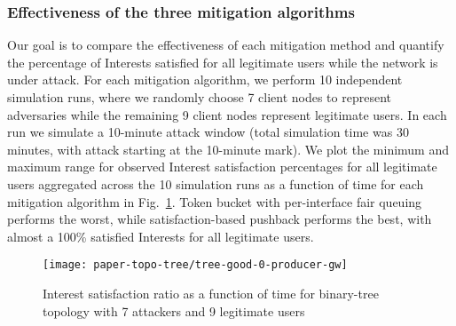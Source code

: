\subsubsection{Effectiveness of the three mitigation algorithms}


Our goal is to compare the effectiveness of each mitigation method and quantify the percentage of Interests satisfied for all legitimate users while the network is under attack. For each mitigation algorithm, we perform 10 independent simulation runs, where we randomly choose 7 client nodes to represent adversaries while the remaining 9 client nodes represent legitimate users. In each run we simulate a 10-minute attack window (total simulation time was 30 minutes, with attack starting at the 10-minute mark). We plot the minimum and maximum range for observed Interest satisfaction percentages for all legitimate users aggregated across the 10 simulation runs as a function of time for each mitigation algorithm in Fig.~\ref{fig:small-scale attack progress}. Token bucket with per-interface fair queuing performs the worst, while satisfaction-based pushback performs the best, with almost a 100\%  satisfied Interests for all legitimate users.


\begin{figure}[]
  \centering
  \hspace{-0.8cm}\texttt{[image: paper-topo-tree/tree-good-0-producer-gw]}
  \vspace{-.3cm}
  \caption{Interest satisfaction ratio as a function of time for binary-tree topology with 7 attackers and 9 legitimate users}
  \label{fig:small-scale attack progress}
  \vspace{-.4cm}
\end{figure}


